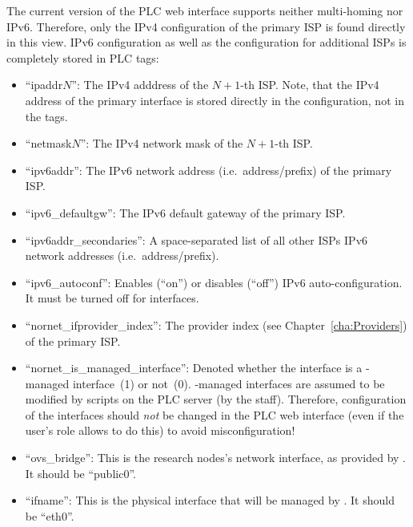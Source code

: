 The current version of the PLC web interface supports neither multi-homing nor IPv6. Therefore, only the IPv4 configuration of the primary ISP is found directly in this view. IPv6 configuration as well as the configuration for additional ISPs is completely stored in PLC tags:
\begin{itemize}
 \item ``ipaddr$N$'': The IPv4 adddress of the $N+1$-th ISP. Note, that the IPv4 address of the primary interface is stored directly in the configuration, not in the tags.
 
 \item ``netmask$N$'': The IPv4 network mask of the $N+1$-th ISP.

 \item ``ipv6addr'': The IPv6 network address (i.e.\ address/prefix) of the primary ISP.
  
 \item ``ipv6\_defaultgw'': The IPv6 default gateway of the primary ISP.

 \item ``ipv6addr\_secondaries'': A space-separated list of all other ISPs IPv6 network addresses (i.e.\ address/prefix).
 
 \item ``ipv6\_autoconf'': Enables (``on'') or disables (``off'') IPv6 auto-configuration. It must be turned off for  interfaces.

 \item ``nornet\_ifprovider\_index'': The provider index (see Chapter~\ref{cha:Providers}) of the primary ISP.

 \item ``nornet\_is\_managed\_interface'': Denoted whether the interface is a -managed interface~(1) or not~(0). -managed interfaces are assumed to be modified by scripts on the PLC server (by the  staff). Therefore, configuration of the interfaces should \emph{not} be changed in the PLC web interface (even if the user's role allows to do this) to avoid misconfiguration!

 \item ``ovs\_bridge'': This is the research nodes's network interface, as provided by . It should be ``public0''.

 \item ``ifname'': This is the physical interface that will be managed by . It should be ``eth0''.
\end{itemize}

